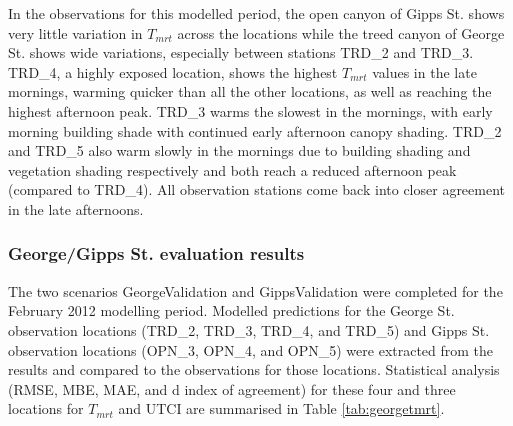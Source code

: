 \documentclass[final,3p,times,authoryear]{elsarticle}
\begin{document}
In the \cite{Coutts2015} observations for this modelled period, the open canyon of Gipps St. shows very little variation in $T_{mrt}$ across the locations while the treed canyon of George St. shows wide variations, especially between stations TRD\_2 and TRD\_3. TRD\_4, a highly exposed location, shows the highest $T_{mrt}$ values in the late mornings, warming quicker than all the other locations, as well as reaching the highest afternoon peak. TRD\_3 warms the slowest in the mornings, with early morning building shade with continued early afternoon canopy shading. TRD\_2 and TRD\_5 also warm slowly in the mornings due to building shading and vegetation shading respectively and both reach a reduced afternoon peak (compared to TRD\_4).  All observation stations come back into closer agreement in the late afternoons.

\subsubsection{George/Gipps St. evaluation results}


The two scenarios GeorgeValidation and GippsValidation were completed for the February 2012 modelling period. Modelled predictions for the George St. observation locations (TRD\_2, TRD\_3, TRD\_4, and TRD\_5) and Gipps St. observation locations (OPN\_3, OPN\_4, and OPN\_5) were extracted from the results and compared to the observations for those locations. Statistical analysis (RMSE, MBE, MAE, and d index of agreement) for these four and three locations for $T_{mrt}$ and UTCI are summarised in Table \ref{tab:georgetmrt}.
\end{document}
